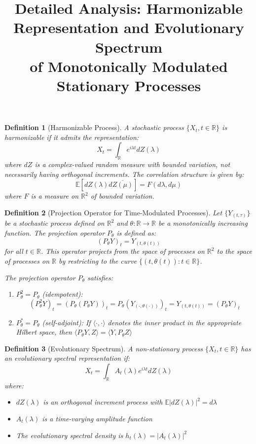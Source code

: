 \documentclass{article}
\newtheorem{definition}{Definition}
\begin{document}
\title{Detailed Analysis: Harmonizable Representation and Evolutionary Spectrum\\of Monotonically Modulated Stationary Processes}
\author{}
\date{}
\maketitle

\begin{definition}[Harmonizable Process]
A stochastic process $\{X_t, t \in \mathbb{R}\}$ is \textit{harmonizable} if it admits the representation:
$$X_t = \int_{\mathbb{R}} e^{i\lambda t} dZ(\lambda)$$
where $dZ$ is a complex-valued random measure with bounded variation, not necessarily having orthogonal increments. The correlation structure is given by:
$$\mathbb{E}[dZ(\lambda)d\overline{Z(\mu)}] = F(d\lambda, d\mu)$$
where $F$ is a measure on $\mathbb{R}^2$ of bounded variation.
\end{definition}

\begin{definition}[Projection Operator for Time-Modulated Processes]
Let $\{Y_{(t,\tau)}\}$ be a stochastic process defined on $\mathbb{R}^2$ and $\theta: \mathbb{R} \to \mathbb{R}$ be a monotonically increasing function. The \textit{projection operator} $P_\theta$ is defined as:
$$(P_\theta Y)_t = Y_{(t,\theta(t))}$$
for all $t \in \mathbb{R}$. This operator projects from the space of processes on $\mathbb{R}^2$ to the space of processes on $\mathbb{R}$ by restricting to the curve $\{(t,\theta(t)): t \in \mathbb{R}\}$.

The projection operator $P_\theta$ satisfies:
\begin{enumerate}
\item $P_\theta^2 = P_\theta$ (idempotent): 
$$(P_\theta^2 Y)_t = (P_\theta(P_\theta Y))_t = P_\theta(Y_{(\cdot,\theta(\cdot))})_t = Y_{(t,\theta(t))} = (P_\theta Y)_t$$
\item $P_\theta^* = P_\theta$ (self-adjoint): If $\langle \cdot, \cdot \rangle$ denotes the inner product in the appropriate Hilbert space, then $\langle P_\theta Y, Z \rangle = \langle Y, P_\theta Z \rangle$
\end{enumerate}
\end{definition}

\begin{definition}[Evolutionary Spectrum]
A non-stationary process $\{X_t, t \in \mathbb{R}\}$ has an evolutionary spectral representation if:
$$X_t = \int_{\mathbb{R}} A_t(\lambda)e^{i\lambda t}dZ(\lambda)$$
where:
\begin{itemize}
\item $dZ(\lambda)$ is an orthogonal increment process with $\mathbb{E}|dZ(\lambda)|^2 = d\lambda$
\item $A_t(\lambda)$ is a time-varying amplitude function
\item The evolutionary spectral density is $h_t(\lambda) = |A_t(\lambda)|^2$
\end{itemize}
\end{definition}
\end{document}
